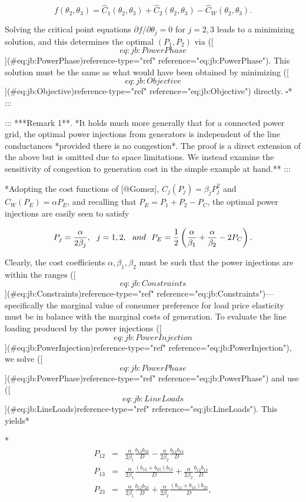 $$f(\theta_2,\theta_3) = \hat C_1(\theta_2,\theta_3)+\hat C_2(\theta_2,\theta_3)-\hat C_W(\theta_2,\theta_3).$$

Solving the critical point equations $\partial f/\partial\theta_j=0$ for $j=2,3$ leads to a minimizing solution, and this determines the optimal $(P_1,P_2)$ via ([\[eq:jb:PowerPhase\]](#eq:jb:PowerPhase){reference-type="ref" reference="eq:jb:PowerPhase"}). This solution must be the same as what would have been obtained by minimizing ([\[eq:jb:Objective\]](#eq:jb:Objective){reference-type="ref" reference="eq:jb:Objective"}) directly. $\square$* :::

::: ***Remark 1**. *It holds much more generally that for a connected power grid, the optimal power injections from generators is independent of the line conductances *provided there is no congestion*. The proof is a direct extension of the above but is omitted due to space limitations. We instead examine the sensitivity of congestion to generation cost in the simple example at hand.** :::

*Adopting the cost functions of [@Gomez], $C_j(P_j)=\beta_j P_j^2$ and $C_W(P_E)=\alpha P_E$, and recalling that $P_E=P_1+P_2-P_C$, the optimal power injections are easily seen to satisfy

$$P_j=\frac{\alpha}{2\beta_j},\ \ j=1,2,\ \ {\textrm and}\ \ P_E=\frac12 \left(\frac{\alpha}{\beta_1} + \frac{\alpha}{\beta_2} - 2P_C\right). \label{eq:jb:PowerInjection}$$

Clearly, the cost coefficients $\alpha,\beta_1,\beta_2$ must be such that the power injections are within the ranges ([\[eq:jb:Constraints\]](#eq:jb:Constraints){reference-type="ref" reference="eq:jb:Constraints"})---specifically the marginal value of consumer preference for load price elasticity must be in balance with the marginal costs of generation. To evaluate the line loading produced by the power injections ([\[eq:jb:PowerInjection\]](#eq:jb:PowerInjection){reference-type="ref" reference="eq:jb:PowerInjection"}), we solve ([\[eq:jb:PowerPhase\]](#eq:jb:PowerPhase){reference-type="ref" reference="eq:jb:PowerPhase"}) and use ([\[eq:jb:LineLoads\]](#eq:jb:LineLoads){reference-type="ref" reference="eq:jb:LineLoads"}). This yields*

*$$\begin{array}{ccl} P_{12} & = &\frac{ \alpha}{ 2 \beta_1} \frac{b_{12} b_{23}}{D} -  \frac{\alpha} {2 \beta_2} \frac{ b_{12} b_{13} }{D}\\[0.1in] 
P_{13} & = & \frac{ \alpha}{ 2 \beta_1} \frac{ (b_{12}+b_{23}) b_{13} }{ D}  
   + \frac{ \alpha}{ 2 \beta_2}\frac{ b_{12} b_{13}}{ D} \\[0.1in]
 P_{23} & = &\frac{\alpha}{2 \beta_1 } \frac{ b_{12} b_{23}}{D }
  +  \frac{\alpha}{2 \beta_2}\frac{(b_{12} + b_{13}) b_{23}}{D}, \end{array}$$

